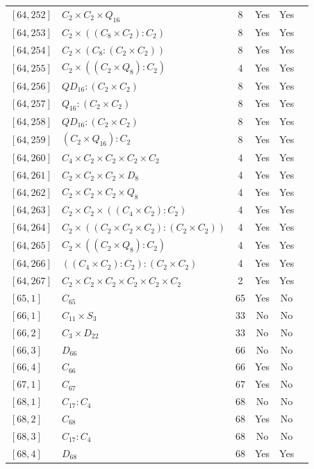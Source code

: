 \documentclass[12pt, a4paper]{article}
\theoremstyle{plain}
\theoremstyle{definition}
\begin{document}
\begin{longtable}{llcccl}
  $[64,252]$ & $C_2 \times C_2 \times Q_{16}$ & 8 & Yes & Yes \\
  $[64,253]$ & $C_2 \times ((C_8 \times C_2) : C_2)$ & 8 & Yes & Yes \\
  $[64,254]$ & $C_2 \times (C_8 : (C_2 \times C_2))$ & 8 & Yes & Yes \\
  $[64,255]$ & $C_2 \times ((C_2 \times Q_8) : C_2)$ & 4 & Yes & Yes \\
  $[64,256]$ & $QD_{16} : (C_2 \times C_2)$ & 8 & Yes & Yes \\
  $[64,257]$ & $Q_{16} : (C_2 \times C_2)$ & 8 & Yes & Yes \\
  $[64,258]$ & $QD_{16} : (C_2 \times C_2)$ & 8 & Yes & Yes \\
  $[64,259]$ & $(C_2 \times Q_{16}) : C_2$ & 8 & Yes & Yes \\
  $[64,260]$ & $C_4 \times C_2 \times C_2 \times C_2 \times C_2$ & 4 & Yes & Yes \\
  $[64,261]$ & $C_2 \times C_2 \times C_2 \times D_8$ & 4 & Yes & Yes \\
  $[64,262]$ & $C_2 \times C_2 \times C_2 \times Q_8$ & 4 & Yes & Yes \\
  $[64,263]$ & $C_2 \times C_2 \times ((C_4 \times C_2) : C_2)$ & 4 & Yes & Yes \\
  $[64,264]$ & $C_2 \times ((C_2 \times C_2 \times C_2) : (C_2 \times C_2))$ & 4 & Yes & Yes \\
  $[64,265]$ & $C_2 \times ((C_2 \times Q_8) : C_2)$ & 4 & Yes & Yes \\
  $[64,266]$ & $((C_4 \times C_2) : C_2) : (C_2 \times C_2)$ & 4 & Yes & Yes \\
  $[64,267]$ & $C_2 \times C_2 \times C_2 \times C_2 \times C_2 \times C_2$ & 2 & Yes & Yes \\
  $[65,1]$ & $C_{65}$ & 65 & Yes & No \\
  $[66,1]$ & $C_{11} \times S_3$ & 33 & No & No \\
  $[66,2]$ & $C_3 \times D_{22}$ & 33 & No & No \\
  $[66,3]$ & $D_{66}$ & 66 & No & No \\
  $[66,4]$ & $C_{66}$ & 66 & Yes & No \\
  $[67,1]$ & $C_{67}$ & 67 & Yes & No \\
  $[68,1]$ & $C_{17} : C_4$ & 68 & No & No \\
  $[68,2]$ & $C_{68}$ & 68 & Yes & No \\
  $[68,3]$ & $C_{17} : C_4$ & 68 & No & No \\
  $[68,4]$ & $D_{68}$ & 68 & Yes & Yes \\

\end{longtable}
\end{document}
